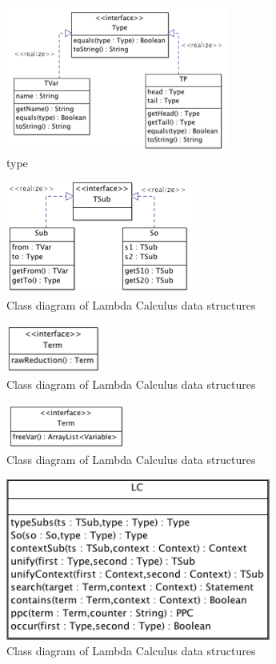 \documentclass[a4paper,11pt,twoside]{report}
\begin{document}
\begin{figure}[ht]
\centering
\includegraphics[scale=0.7]{Type}
\caption{type}
\label{fig:type}
\end{figure}


\begin{figure}[ht]
\centering
\includegraphics[scale=0.7]{TSub}
\caption{Class diagram of Lambda Calculus data structures}
\label{fig:term1}
\end{figure}


\begin{figure}[ht]
\centering
\includegraphics[scale=0.7]{TermRaw}
\caption{Class diagram of Lambda Calculus data structures}
\label{fig:term1}
\end{figure}


\begin{figure}
\centering
\includegraphics[scale=0.7]{TermType}
\caption{Class diagram of Lambda Calculus data structures}
\label{fig:term1}
\end{figure}



\begin{figure}
\centering
\includegraphics[scale=0.6]{LCType}
\caption{Class diagram of Lambda Calculus data structures}
\label{fig:term1}
\end{figure}
\end{document}
